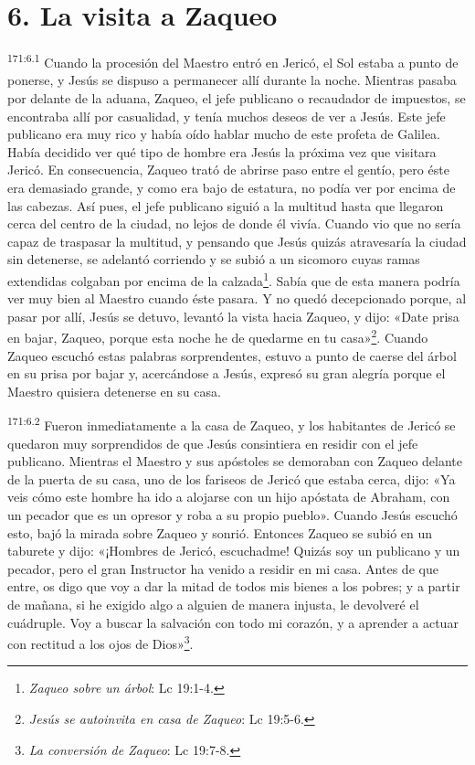 \section*{6. La visita a Zaqueo}
\par 
\textsuperscript{171:6.1} Cuando la procesión del Maestro entró en Jericó, el Sol estaba a punto de ponerse, y Jesús se dispuso a permanecer allí durante la noche. Mientras pasaba por delante de la aduana, Zaqueo, el jefe publicano o recaudador de impuestos, se encontraba allí por casualidad, y tenía muchos deseos de ver a Jesús. Este jefe publicano era muy rico y había oído hablar mucho de este profeta de Galilea. Había decidido ver qué tipo de hombre era Jesús la próxima vez que visitara Jericó. En consecuencia, Zaqueo trató de abrirse paso entre el gentío, pero éste era demasiado grande, y como era bajo de estatura, no podía ver por encima de las cabezas. Así pues, el jefe publicano siguió a la multitud hasta que llegaron cerca del centro de la ciudad, no lejos de donde él vivía. Cuando vio que no sería capaz de traspasar la multitud, y pensando que Jesús quizás atravesaría la ciudad sin detenerse, se adelantó corriendo y se subió a un sicomoro cuyas ramas extendidas colgaban por encima de la calzada\footnote{\textit{Zaqueo sobre un árbol}: Lc 19:1-4.}. Sabía que de esta manera podría ver muy bien al Maestro cuando éste pasara. Y no quedó decepcionado porque, al pasar por allí, Jesús se detuvo, levantó la vista hacia Zaqueo, y dijo: «Date prisa en bajar, Zaqueo, porque esta noche he de quedarme en tu casa»\footnote{\textit{Jesús se autoinvita en casa de Zaqueo}: Lc 19:5-6.}. Cuando Zaqueo escuchó estas palabras sorprendentes, estuvo a punto de caerse del árbol en su prisa por bajar y, acercándose a Jesús, expresó su gran alegría porque el Maestro quisiera detenerse en su casa.

\par 
\textsuperscript{171:6.2} Fueron inmediatamente a la casa de Zaqueo, y los habitantes de Jericó se quedaron muy sorprendidos de que Jesús consintiera en residir con el jefe publicano. Mientras el Maestro y sus apóstoles se demoraban con Zaqueo delante de la puerta de su casa, uno de los fariseos de Jericó que estaba cerca, dijo: «Ya veis cómo este hombre ha ido a alojarse con un hijo apóstata de Abraham, con un pecador que es un opresor y roba a su propio pueblo». Cuando Jesús escuchó esto, bajó la mirada sobre Zaqueo y sonrió. Entonces Zaqueo se subió en un taburete y dijo: «¡Hombres de Jericó, escuchadme! Quizás soy un publicano y un pecador, pero el gran Instructor ha venido a residir en mi casa. Antes de que entre, os digo que voy a dar la mitad de todos mis bienes a los pobres; y a partir de mañana, si he exigido algo a alguien de manera injusta, le devolveré el cuádruple. Voy a buscar la salvación con todo mi corazón, y a aprender a actuar con rectitud a los ojos de Dios»\footnote{\textit{La conversión de Zaqueo}: Lc 19:7-8.}.

